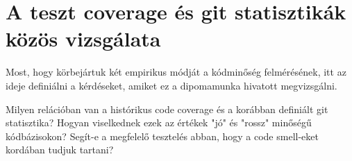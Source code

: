 \section{A teszt coverage és git statisztikák közös vizsgálata}

Most, hogy körbejártuk két empirikus módját a kódminőség felmérésének, itt az ideje definiálni a kérdéseket, amiket ez a dipomamunka hivatott megvizsgálni.

Milyen relációban van a histórikus code coverage és a korábban definiált git statisztika? Hogyan viselkednek ezek az értékek "jó" és "rossz" minőségű kódbázisokon? Segít-e a megfelelő tesztelés abban, hogy a code smell-eket kordában tudjuk tartani?

